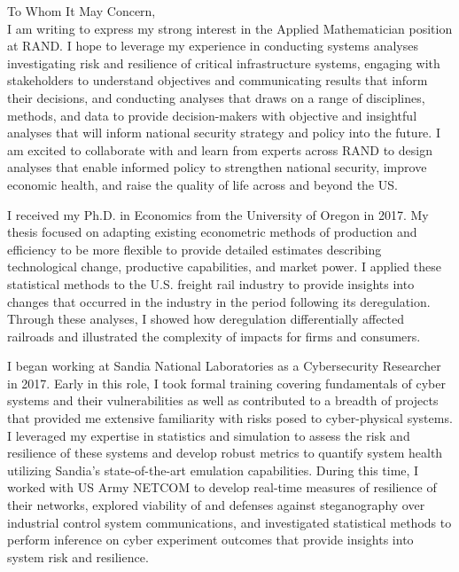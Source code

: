 \documentclass[10pt]{article}
\begin{document}
\noindent To Whom It May Concern,\\

I am writing to express my strong interest in the Applied Mathematician position at RAND. I hope to leverage my experience in conducting systems analyses investigating risk and resilience of critical infrastructure systems, engaging with stakeholders to understand objectives and communicating results that inform their decisions, and conducting analyses that draws on a range of disciplines, methods, and data to provide decision-makers with objective and insightful analyses that will inform national security strategy and policy into the future. I am excited to collaborate with and learn from experts across RAND to design analyses that enable informed policy to strengthen national security, improve economic health, and raise the quality of life across and beyond the US.

I received my Ph.D. in Economics from the University of Oregon in 2017. My thesis focused on adapting existing econometric methods of production and efficiency to be more flexible to provide detailed estimates describing technological change, productive capabilities, and market power. I applied these statistical methods to the U.S. freight rail industry to provide insights into changes that occurred in the industry in the period following its deregulation. Through these analyses, I showed how deregulation differentially affected railroads and illustrated the complexity of impacts for firms and consumers. 

I began working at Sandia National Laboratories as a Cybersecurity Researcher in 2017. Early in this role, I took formal training covering fundamentals of cyber systems and their vulnerabilities as well as contributed to a breadth of projects that provided me extensive familiarity with risks posed to cyber-physical systems. I leveraged my expertise in statistics and simulation to assess the risk and resilience of these systems and develop robust metrics to quantify system health utilizing Sandia's state-of-the-art emulation capabilities. During this time, I worked with US Army NETCOM to develop real-time measures of resilience of their networks, explored viability of and defenses against steganography over industrial control system communications, and investigated statistical methods to perform inference on cyber experiment outcomes that provide insights into system risk and resilience.
\end{document}
